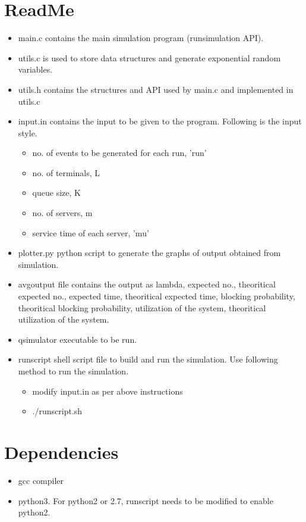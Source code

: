 \documentclass[11pt]{article}
\begin{document}
 \section{ReadMe}
 \begin{itemize}
 \item main.c contains the main simulation program (run\textunderscore simulation API).
 \item utils.c is used to store data structures and generate exponential random variables.
 \item utils.h contains the structures and API used by main.c and implemented in utils.c
 \item input.in contains the input to be given to the program. Following is the input style.
 \begin{itemize}
 \item no. of events to be generated for each run, 'run'
 \item no. of terminals, L
 \item queue size, K
 \item no. of servers, m
 \item service time of each server, 'mu'
 \end{itemize}
 \item plotter.py python script to generate the graphs of output obtained from simulation.
 \item avg\textunderscore output file contains the output as lambda, expected no., theoritical expected no., expected time, theoritical expected time, blocking probability, theoritical blocking probability, utilization of the system, theoritical utilization of the system.
 \item q\textunderscore simulator executable to be run.
 \item run\textunderscore script shell script file to build and run the simulation. Use following method to run the simulation.
 \begin{itemize}
 \item modify input.in as per above instructions
 \item ./run\textunderscore script.sh 
 \end{itemize}
 \end{itemize}
 \section{Dependencies}
 \begin{itemize}
 \item gcc compiler
 \item python3. For python2 or 2.7, run\textunderscore script needs to be modified to enable python2. 
 \end{itemize}
\end{document}
